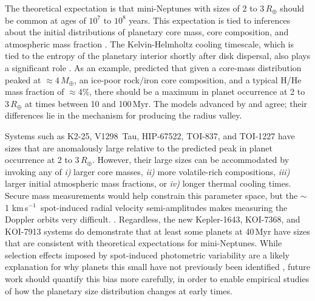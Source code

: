 \documentclass[12pt,twocolumn]{aastex63}
\newcommand{\kms}{\,km\,s$^{-1}$}
\begin{document}
The theoretical expectation is that mini-Neptunes with sizes of 2 to
3\,$R_\oplus$ should be common at ages of $10^7$ to $10^8$ years.
This expectation is tied to inferences about the initial distributions
of planetary core mass, core composition, and atmospheric mass
fraction \citep{owen_evaporation_2017}.  The Kelvin-Helmholtz cooling
timescale, which is tied to the entropy of the planetary interior
shortly after
disk dispersal, also plays a significant role
\citep{owen_constraining_2020}.  As an example,
\citet{rogers_unveiling_2021} predicted that given a core-mass
distribution peaked at $\approx$$4$\,$M_\oplus$, an ice-poor rock/iron
core composition, and a typical H/He mass fraction of $\approx$4\%,
there should be a maximum in planet occurrence at 2 to 3\,$R_\oplus$
at times between 10 and 100\,Myr.  The models
advanced by \citet{gupta_signatures_2020} and
\citet{lee_primordial_2021} agree; their differences lie in the mechanism
for producing the radius valley. 

Systems such as K2-25, V1298~Tau, HIP-67522, TOI-837, and TOI-1227
have sizes that are anomalously large relative to the predicted peak
in planet occurrence at 2 to 3\,$R_\oplus$.
However, their large sizes can be accommodated 
by invoking any of {\it i)} larger core masses, {\it ii)} more
volatile-rich compositions, {\it iii)}  larger initial atmospheric
mass fractions, or {\it iv)} longer thermal cooling times.  
Secure mass measurements would help constrain this parameter space,
but the $\sim$1\,\kms\ spot-induced radial velocity semi-amplitudes
makes measuring the Doppler orbits very difficult.
\citep[][]{cale_diving_2021,zicher_one_2022,klein_one_2022}.
Regardless, the new Kepler-1643, KOI-7368, and KOI-7913 systems do
demonstrate that at least some planets at 40\,Myr have sizes that are
consistent with theoretical expectations for mini-Neptunes.  While
selection effects imposed by spot-induced photometric variability are
a likely explanation for why planets this small have not previously
been identified \citep[{e.g.},][]{zhou_2021_tois}, future work should
quantify this bias more carefully, in order to enable empirical
studies of how the planetary size distribution changes at early times.
\end{document}
